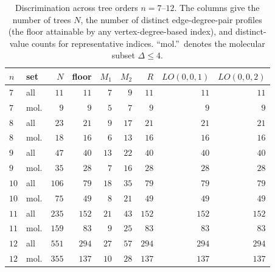 \documentclass[a5paper, 10pt]{article}
\theoremstyle{plain}
\theoremstyle{remark}
\theoremstyle{definition}
\begin{document}
\begin{table}[H]
\centering
\caption{Discrimination across tree orders $n = 7$--$12$. The columns
give the number of trees $N$, the number of distinct edge-degree-pair
profiles (the floor attainable by any vertex-degree-based index), and
distinct-value counts for representative indices. ``mol.''\ denotes the
molecular subset $\Delta \le 4$.}
\label{tab:multiorder}
\small
\begin{tabular}{llrrrrrrr}
\toprule
$n$ & set & $N$ & floor & $M_1$ & $M_2$ & $R$ & $LO(0,0,1)$ & $LO(0,0,2)$\\
\midrule
$7$ & all & $11$ & $11$ & $7$ & $9$ & $11$ & $11$ & $11$\\
$7$ & mol. & $9$ & $9$ & $5$ & $7$ & $9$ & $9$ & $9$\\
$8$ & all & $23$ & $21$ & $9$ & $17$ & $21$ & $21$ & $21$\\
$8$ & mol. & $18$ & $16$ & $6$ & $13$ & $16$ & $16$ & $16$\\
$9$ & all & $47$ & $40$ & $13$ & $22$ & $40$ & $40$ & $40$\\
$9$ & mol. & $35$ & $28$ & $7$ & $16$ & $28$ & $28$ & $28$\\
$10$ & all & $106$ & $79$ & $18$ & $35$ & $79$ & $79$ & $79$\\
$10$ & mol. & $75$ & $49$ & $8$ & $21$ & $49$ & $49$ & $49$\\
$11$ & all & $235$ & $152$ & $21$ & $43$ & $152$ & $152$ & $152$\\
$11$ & mol. & $159$ & $83$ & $9$ & $25$ & $83$ & $83$ & $83$\\
$12$ & all & $551$ & $294$ & $27$ & $57$ & $294$ & $294$ & $294$\\
$12$ & mol. & $355$ & $137$ & $10$ & $28$ & $137$ & $137$ & $137$\\
\bottomrule
\end{tabular}
\end{table}
\end{document}
